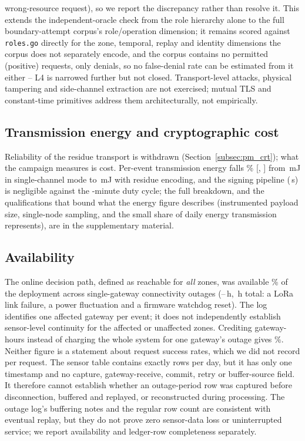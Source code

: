 \documentclass[a4paper,fleqn]{cas-sc}
\begin{document}
wrong-resource request), so we report the discrepancy rather than resolve
it. This extends the independent-oracle check from the role hierarchy
alone to the full boundary-attempt corpus's role/operation dimension; it
remains scored against \texttt{roles.go} directly for the zone, temporal,
replay and identity dimensions the corpus does not separately encode, and
the corpus contains no permitted (positive) requests, only denials, so no
false-denial rate can be estimated from it either -- L4 is narrowed
further but not closed. Transport-level attacks,
physical tampering and side-channel extraction are not exercised; mutual
TLS and constant-time primitives address them architecturally, not
empirically.

\subsection{Transmission energy and cryptographic cost}
\label{subsec:integrity}

Reliability of the residue transport is withdrawn (Section~\ref{subsec:pm_crt});
what the campaign measures is cost. Per-event transmission energy falls
\EnergyReductionPct\% [\EnergyReductionCILow, \EnergyReductionCIHigh] from
\EnergySingle\,mJ in single-channel mode to \EnergyCRT\,mJ with residue
encoding, and the signing pipeline (\SignTotal\,\textmu{}s) is negligible
against the \DutyCycleMinutes-minute duty cycle; the full breakdown, and
the qualifications that bound what the energy figure describes (instrumented
payload size, single-node sampling, and the small share of daily energy
transmission represents), are in the supplementary material.

\subsection{Availability}
\label{subsec:availability}

The online decision path, defined as reachable for \emph{all} zones, was
available \UptimePct\% of the deployment across \OutageCount{}
single-gateway connectivity outages (\OutageHoursMin--\OutageHoursMax\,h,
\OutageHoursTotal\,h total: a LoRa link failure, a power fluctuation and a
firmware watchdog reset). The log identifies one affected gateway per event;
it does not independently establish sensor-level continuity for the affected
or unaffected zones. Crediting gateway-hours instead of charging the whole
system for one gateway's outage gives \UptimeGatewayHoursPct\%. Neither
figure is a statement about request success rates, which we did not
record per request. The sensor table contains exactly \WritesPerDay{} rows
per day, but it has only one timestamp and no capture, gateway-receive,
commit, retry or buffer-source field. It therefore cannot establish whether
an outage-period row was captured before disconnection, buffered and replayed,
or reconstructed during processing. The outage log's buffering notes and the
regular row count are consistent with eventual replay, but they do not prove
zero sensor-data loss or uninterrupted service; we report availability and
ledger-row completeness separately.
\end{document}
